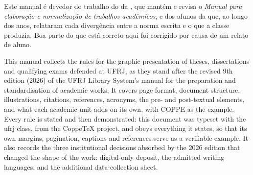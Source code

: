 \documentclass[dsc]{ufrj}
\begin{document}
  Este manual é devedor do trabalho do  da , que mantém e
  revisa o \emph{Manual para elaboração e normalização de trabalhos acadêmicos},
  e dos alunos da  que, ao longo dos anos, relataram cada
  divergência entre a norma escrita e o que a classe produzia. Boa parte do que
  está correto aqui foi corrigido por causa de um relato de aluno.

  \begin{abstract}
    \label{norma:resumo}%
    Este manual reúne as regras de apresentação gráfica de teses, dissertações e
    exames de qualificação defendidos na , na forma em que elas
    valem depois da 9.ª edição revista (2026) do \emph{Manual para elaboração e
    normalização de trabalhos acadêmicos} do . Trata do formato
    da página, da estrutura do trabalho, das ilustrações, das citações, das
    referências, das siglas e dos elementos pré e pós-textuais, e do que cada
    unidade acadêmica acrescenta por conta própria, com a  como
    exemplo. Cada regra é enunciada e, em seguida, demonstrada: este documento
    foi composto com a classe \texttt{ufrj}, do projeto \CoppeTeX, e obedece a
    tudo o que enuncia, de modo
    que a sua margem, a sua paginação, as suas legendas e as suas referências
    servem de exemplo verificável. Registram-se também as três decisões
    institucionais que a edição de 2026 absorveu e que mudaram a forma do
    trabalho: o depósito exclusivamente digital, os idiomas de redação admitidos
    e a folha adicional de coleta de dados.
  \end{abstract}

  \begin{foreignabstract}
    This manual collects the rules for the graphic presentation of theses,
    dissertations and qualifying exams defended at UFRJ, as they stand after the
    revised 9th edition (2026) of the UFRJ Library System's manual for the
    preparation and standardisation of academic works. It covers page format,
    document structure, illustrations, citations, references, acronyms, the pre-
    and post-textual elements, and what each academic unit adds on its own, with
    COPPE as the example. Every rule is stated and then
    demonstrated: this document was typeset with the ufrj class, from the
    CoppeTeX project, and obeys
    everything it states, so that its own margins, pagination, captions and
    references serve as a verifiable example. It also records the three
    institutional decisions absorbed by the 2026 edition that changed the shape
    of the work: digital-only deposit, the admitted writing languages, and the
    additional data-collection sheet.
  \end{foreignabstract}
\end{document}
